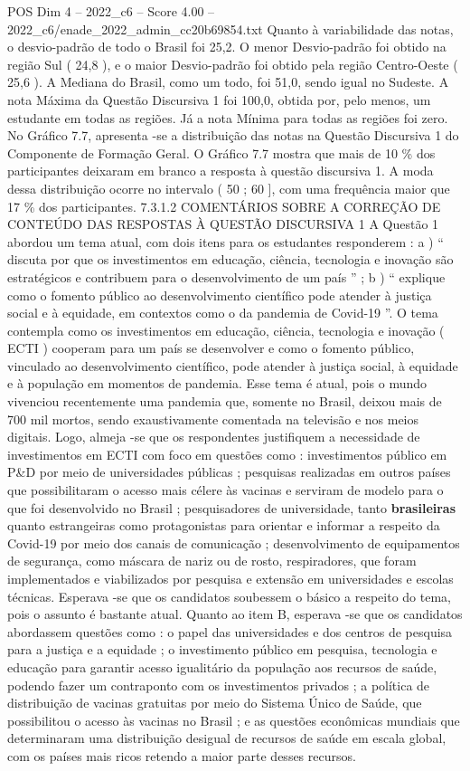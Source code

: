 \begin{textsample}{POS Dim 4 – 2022\_c6 – Score 4.00 – 2022\_c6/enade\_2022\_admin\_cc20b69854.txt}
Quanto à variabilidade das notas, o desvio-padrão de todo o Brasil foi 25,2.
O menor Desvio-padrão foi obtido na região Sul ( 24,8 ), e o maior Desvio-padrão foi obtido pela região Centro-Oeste ( 25,6 ).
A Mediana do Brasil, como um todo, foi 51,0, sendo igual no Sudeste.
A nota Máxima da Questão Discursiva 1 foi 100,0, obtida por, pelo menos, um estudante em todas as regiões.
Já a nota Mínima para todas as regiões foi zero.
No Gráfico 7.7, apresenta -se a distribuição das notas na Questão Discursiva 1 do Componente de Formação Geral.
O Gráfico 7.7 mostra que mais de 10 \% dos participantes deixaram em branco a resposta à questão discursiva 1.
A moda dessa distribuição ocorre no intervalo ( 50 ; 60 ], com uma frequência maior que 17 \% dos participantes. 7.3.1.2 COMENTÁRIOS SOBRE A CORREÇÃO DE CONTEÚDO DAS RESPOSTAS À QUESTÃO DISCURSIVA 1 A Questão 1 abordou um tema atual, com dois itens para os estudantes responderem : a ) “ discuta por que os investimentos em educação, ciência, tecnologia e inovação são estratégicos e contribuem para o desenvolvimento de um país ” ; b ) “ explique como o fomento público ao desenvolvimento científico pode atender à justiça social e à equidade, em contextos como o da pandemia de Covid-19 ”.
O tema contempla como os investimentos em educação, ciência, tecnologia e inovação ( ECTI ) cooperam para um país se desenvolver e como o fomento público, vinculado ao desenvolvimento científico, pode atender à justiça social, à equidade e à população em momentos de pandemia.
Esse tema é atual, pois o mundo vivenciou recentemente uma pandemia que, somente no Brasil, deixou mais de 700 mil mortos, sendo exaustivamente comentada na televisão e nos meios digitais.
Logo, almeja -se que os respondentes justifiquem a necessidade de investimentos em ECTI com foco em questões como : investimentos público em P\&D por meio de universidades públicas ; pesquisas realizadas em outros países que possibilitaram o acesso mais célere às vacinas e serviram de modelo para o que foi desenvolvido no Brasil ; pesquisadores de universidade, tanto \textbf{brasileiras} quanto estrangeiras como protagonistas para orientar e informar a respeito da Covid-19 por meio dos canais de comunicação ; desenvolvimento de equipamentos de segurança, como máscara de nariz ou de rosto, respiradores, que foram implementados e viabilizados por pesquisa e extensão em universidades e escolas técnicas.
Esperava -se que os candidatos soubessem o básico a respeito do tema, pois o assunto é bastante atual.
Quanto ao item B, esperava -se que os candidatos abordassem questões como : o papel das universidades e dos centros de pesquisa para a justiça e a equidade ; o investimento público em pesquisa, tecnologia e educação para garantir acesso igualitário da população aos recursos de saúde, podendo fazer um contraponto com os investimentos privados ; a política de distribuição de vacinas gratuitas por meio do Sistema Único de Saúde, que possibilitou o acesso às vacinas no Brasil ; e as questões econômicas mundiais que determinaram uma distribuição desigual de recursos de saúde em escala global, com os países mais ricos retendo a maior parte desses recursos.

\end{textsample}
